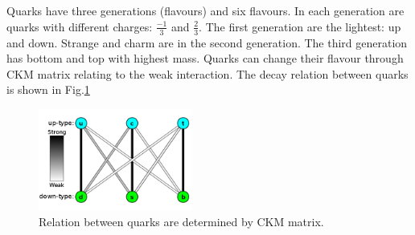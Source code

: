 \\
\\Quarks have three generations (flavours) and six flavours. In each generation are quarks with different charges: $\frac{-1}{3}$ and $\frac{2}{3}$. The first generation are the lightest: up and down. Strange and charm are in the second generation. The third generation has bottom and top with highest mass. Quarks can change their flavour through CKM matrix relating to the weak interaction. The decay relation between quarks is shown in Fig.\ref{Fig:quarks}
\\    
\begin{figure}[!h]                
	\includegraphics[width=0.45\textwidth]{Chapter1/quarks.png}
	\centering
	\begin{center}
		\caption{Relation between quarks are determined by CKM matrix.}
		\label{Fig:quarks}            
	\end{center}
\end{figure}

